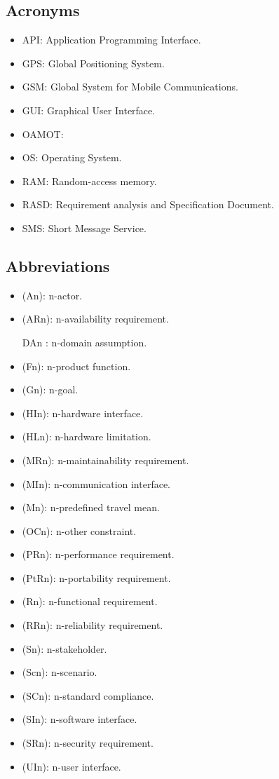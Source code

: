 \documentclass[a4paper,leqno]{book}
\begin{document}
\subsection{Acronyms}
\begin{itemize}
	\item API: Application Programming Interface.
	\item GPS: Global Positioning System.
	\item GSM: Global System for Mobile Communications.
	\item GUI: Graphical User Interface.
	\item OAMOT:
	\item OS: Operating System.
	\item RAM: Random-access memory.
	\item RASD: Requirement analysis and Specification Document.
	\item SMS: Short Message Service.
\end{itemize}


\subsection{Abbreviations}
\begin{itemize}
	\item (An): n-actor.
	\item (ARn): n-availability requirement.
	\item [DAn]: n-domain assumption.
	\item (Fn): n-product function.	
	\item (Gn): n-goal.
	\item (HIn): n-hardware interface.
	\item (HLn): n-hardware limitation.
	\item (MRn): n-maintainability requirement.
	\item (MIn): n-communication interface.
	\item (Mn): n-predefined travel mean.
	\item (OCn):
n-other constraint.
	\item (PRn):
n-performance requirement.
	\item (PtRn): n-portability requirement.
	\item (Rn): n-functional requirement.
	\item (RRn): n-reliability requirement.
	\item (Sn): n-stakeholder.
	\item (Scn): n-scenario.
	\item (SCn): n-standard compliance.
	\item (SIn): n-software interface.
	\item (SRn): n-security requirement.
	\item (UIn): n-user interface.
	
\end{itemize}
\end{document}
